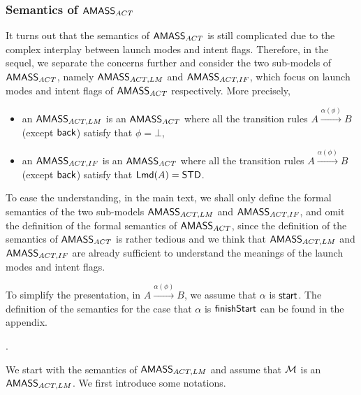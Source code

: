 
\subsubsection{Semantics of $\textsf{AMASS}_{ACT}$}\label{sec:aoamass}

It turns out that the semantics of $\textsf{AMASS}_{ACT}$ is still complicated due to the complex interplay between launch modes and intent flags. Therefore, in the sequel, we separate the concerns further and consider the two sub-models of $\textsf{AMASS}_{ACT}$, namely $\textsf{AMASS}_{ACT,LM}$ and $\textsf{AMASS}_{ACT,IF}$, which focus on launch modes and intent flags of $\textsf{AMASS}_{ACT}$ respectively. 
More precisely, 
%
\begin{itemize}
\item an $\textsf{AMASS}_{ACT,LM}$ is an $\textsf{AMASS}_{ACT}$ where all the transition rules $A \xrightarrow{\alpha(\phi)} B$ (except ${\mathsf{back} }$) satisfy that $\phi = \bot$, 
\item an $\textsf{AMASS}_{ACT,IF}$ is an $\textsf{AMASS}_{ACT}$ where all the transition rules $A \xrightarrow{\alpha(\phi)} B$ (except ${\mathsf{back} }$) satisfy that ${\sf Lmd}(A) = {\sf STD}$. 
\end{itemize}
%
To ease the understanding, in the main text, we shall only define the formal semantics of the two sub-models $\textsf{AMASS}_{ACT,LM}$ and $\textsf{AMASS}_{ACT,IF}$, and omit the definition of the formal semantics of $\textsf{AMASS}_{ACT}$,
since the definition of the semantics of $\textsf{AMASS}_{ACT}$ is rather tedious and we think that $\textsf{AMASS}_{ACT,LM}$ and $\textsf{AMASS}_{ACT,IF}$ are already sufficient to understand the meanings of the launch modes and intent flags. 

To simplify the presentation, in $A \xrightarrow{\alpha(\phi)} B$, we assume that $\alpha$ is ${\mathsf{start} }$. The definition of the semantics for the case that $\alpha$ is ${\mathsf{finishStart} }$ can be found in the appendix. 


\smallskip
{}.
\smallskip

We start with the semantics of $\textsf{AMASS}_{ACT,LM}$ and assume that ${\mathcal{M} }$ is an $\textsf{AMASS}_{ACT,LM}$. 
We first introduce some notations. 


